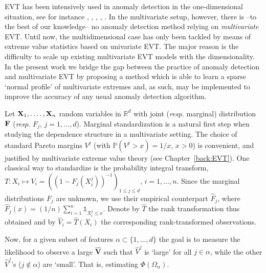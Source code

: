 EVT has been intensively used in anomaly detection in the one-dimensional
situation, see for instance \cite{Roberts99}, \cite{Roberts2000},
\cite{Clifton2011}, \cite{Clifton2008}, \cite{Lee2008}.
In the multivariate setup, however, there is --to the best of our
knowledge--  no anomaly detection method
relying on \textit{multivariate} EVT. Until now, the multidimensional case has only been  tackled by means of extreme value statistics
based on univariate EVT. The major reason is 
the difficulty to scale up existing multivariate EVT models
with the dimensionality. In the present work we bridge the gap between the practice of anomaly detection and multivariate EVT by proposing a method which is
able to learn a sparse `normal profile' of multivariate extremes and,
as such, may be implemented to improve the accuracy of any usual anomaly detection algorithm.




Let $\mathbf X_1,.\ldots,\mathbf X_n$ \iid random variables in $\mathbb{R}^d$ with joint
(\emph{resp.} marginal) distribution $\mathbf F$ (\emph{resp.} $F_j$, $j =
1,\ldots,d$). Marginal standardization is a natural first step when
studying the dependence structure in a multivariate setting. The
choice of standard Pareto margins $V^j$ (with $\mathbb{P}(V^j > x ) =
1/x$, $x>0$) is convenient, and justified by multivariate extreme value theory (see Chapter~\ref{back:EVT}). One classical way to standardize is the
probability integral transform, $T : X_i \mapsto V_i = ( (1- F_j
(X_i^j))^{-1})_{1\leq j\leq d}$, $i = 1,\ldots,n$. 
%
Since the marginal distributions $F_j$ are unknown, we use their
empirical counterpart $\hat F_j$, where $\hat F_j (x) =
(1/n) \sum_{i=1}^n \mathds{1}_{X_i^j\le x}$. 
Denote by $\hat T$ the rank transformation
thus obtained and by $\hat V_i = \hat T(X_i)$ the corresponding rank-transformed
observations. 

Now, for a given subset of features $\alpha \subset \{1,...,d\}$
the goal is to measure the
likelihood to observe a large $\mathbf{\hat V}$ such that $\hat V^j$ is `large' for all
$j\in\alpha$, while the other $\hat V^j$'s ($j \notin \alpha$) are `small'.
That is, estimating $\Phi(\Omega_\alpha)$.

